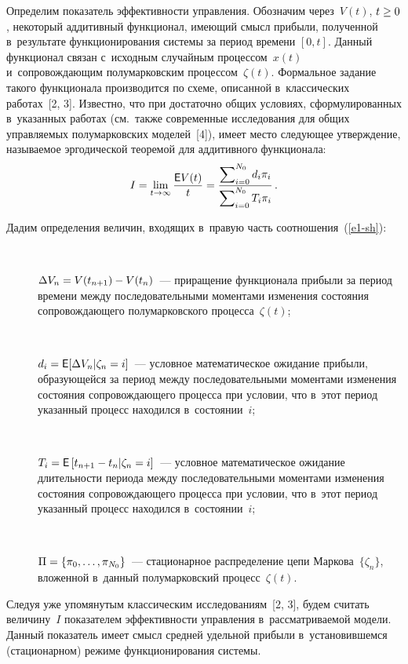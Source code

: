 \begin{multicols}{2}
  Определим показатель эффективности управ\-ле\-ния. Обозначим через~$V(t)$, 
$t\hm\geq 0$, некоторый аддитивный функционал, име\-ющий смысл прибыли, 
полученной в~результате функционирования сис\-те\-мы за период времени $[0,t]$. 
Данный функционал связан с~исходным случайным процессом~$x(t)$ 
и~сопровождающим полумарковским процессом~$\zeta(t)$. Формальное 
задание такого функционала производится по схеме, описанной в~классических 
работах~[2, 3]. Известно, что при достаточно общих условиях, 
сформулированных в~указанных работах (см.\ так\-же современные исследования 
для общих управ\-ля\-емых полумарковских моделей~[4]), имеет мес\-то сле\-ду\-ющее 
утверж\-де\-ние, называемое эргодической тео\-ре\-мой для аддитивного 
функционала:
  \begin{equation}
  I=\lim\limits_{t\to\infty} \displaystyle\frac{\displaystyle {\sf E}V(t)\mathstrut}{\displaystyle t\mathstrut}=\displaystyle\frac{\displaystyle \sum\nolimits_{i=0}^{N_0} d_i \pi_i\mathstrut}{\displaystyle  \sum\nolimits_{i=0}^{N_0} T_i \pi_i\mathstrut}\,.
  \label{e1-sh}
  \end{equation}
  
  Дадим определения величин, входящих в~правую часть соотношения~(\ref{e1-sh}): 
  \begin{description}
  \item[\,]
  $\Delta V_n\hm= V(t_{n+1})\hm- V(t_n)$~--- приращение функ\-ционала 
прибыли за период времени между по\-следовательными моментами изменения 
со\-стояния со\-про\-вож\-да\-юще\-го полумарковского процесса~$\zeta(t)$;
  \item[\,]
   $d_i\hm= {\sf E} [\Delta V_n\vert \zeta_n=i]$~--- условное математическое ожидание прибыли, обра\-зу\-ющей\-ся за период 
между последовательными моментами изменения состояния со\-про\-вож\-да\-юще\-го 
процесса при условии, что в~этот период указанный процесс находился 
в~со\-сто\-янии~$i$;
  \item[\,]
   $T_i={\sf E}\left[t_{n+1}-t_n\vert \zeta_n=i\right]$~--- условное математическое ожидание дли\-тель\-ности периода между 
последовательными моментами изменения со\-сто\-яния со\-про\-вож\-да\-юще\-го 
процесса при условии, что в~этот период указанный процесс находился 
в~со\-сто\-янии~$i$;
  \item[\,]
  $\Pi\hm= \left\{ \pi_0, \ldots ,\pi_{N_0}\right\}$~--- стационарное 
распределение цепи Маркова~$\{\zeta_n\}$, вло\-жен\-ной в~данный 
полумарковский процесс~$\zeta(t)$. 
  \end{description}
  
   Следуя уже упомянутым классическим исследованиям~[2, 3], будем считать 
величину~$I$ показателем эффективности управ\-ле\-ния в~рас\-смат\-ри\-ва\-емой 
модели. Данный показатель имеет смысл сред\-ней удель\-ной прибыли 
в~установившемся (стационарном) режиме функционирования сис\-темы.
  

\end{multicols}
